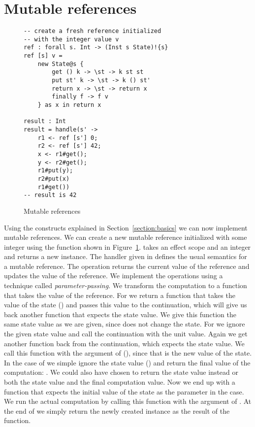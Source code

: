 \section{Mutable references}
\begin{figure}[h]
\caption{Mutable references}
\begin{verbatim}
-- create a fresh reference initialized
-- with the integer value v
ref : forall s. Int -> (Inst s State)!{s}
ref [s] v =
	new State@s {
		get () k -> \st -> k st st
		put st' k -> \st -> k () st'
		return x -> \st -> return x
		finally f -> f v
	} as x in return x

result : Int
result = handle(s' ->
	r1 <- ref [s'] 0;
	r2 <- ref [s'] 42;
	x <- r1#get();
	y <- r2#get();
	r1#put(y);
	r2#put(x)
	r1#get())
-- result is 42
\end{verbatim}
\label{fig:example2}
\end{figure}


Using the constructs explained in Section~\ref{section:basics} we can now implement mutable references.
We can create a new mutable reference initialized with some integer using the  function shown in Figure~\ref{fig:example2}.
 takes an effect scope and an integer and returns a new  instance.
The handler given in  defines the usual semantics for a mutable reference. 
The  operation returns the current value of the reference and  updates the value of the reference.
We implement the operations using a technique called \emph{parameter-passing}\cite{algtutorial}.
We transform the computation to a function that takes the value of the reference.
 For  we return a function that takes the value of the state () and passes this value to the continuation, which will give us back another function that expects the state value. We give this function the same state value as we are given, since  does not change the state.
 For  we ignore the given state value and call the continuation with the unit value.
 Again we get another function back from the continuation, which expects the state value.
 We call this function with the argument of  (), since that is the new value of the state.
 In the case of  we simple ignore the state value () and return the final value of the computation: .
 We could also have chosen to return the state value instead or both the state value and the final computation value.
 Now we end up with a function that expects the initial value of the state as the parameter  in the  case.
 We run the actual computation by calling this function with the  argument of .
 At the end of  we simply return the newly created instance as the result of the function.

